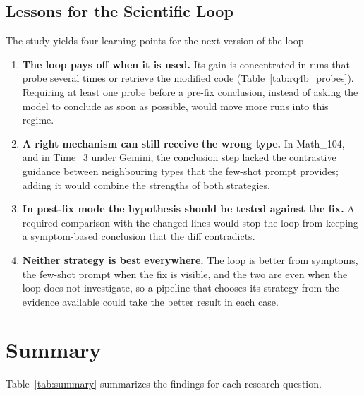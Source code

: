 \documentclass{iutbscthesis}
\begin{document}
\subsection{Lessons for the Scientific Loop}

The study yields four learning points for the next version of the loop.

\begin{enumerate}
    \item \textbf{The loop pays off when it is used.} Its gain is concentrated in runs that probe several times or retrieve the modified code (Table~\ref{tab:rq4b_probes}). Requiring at least one probe before a pre-fix conclusion, instead of asking the model to conclude as soon as possible, would move more runs into this regime.
    \item \textbf{A right mechanism can still receive the wrong type.} In Math\_104, and in Time\_3 under Gemini, the conclusion step lacked the contrastive guidance between neighbouring types that the few-shot prompt provides; adding it would combine the strengths of both strategies.
    \item \textbf{In post-fix mode the hypothesis should be tested against the fix.} A required comparison with the changed lines would stop the loop from keeping a symptom-based conclusion that the diff contradicts.
    \item \textbf{Neither strategy is best everywhere.} The loop is better from symptoms, the few-shot prompt when the fix is visible, and the two are even when the loop does not investigate, so a pipeline that chooses its strategy from the evidence available could take the better result in each case.
\end{enumerate}

\section{Summary}

Table~\ref{tab:summary} summarizes the findings for each research question.
\end{document}
